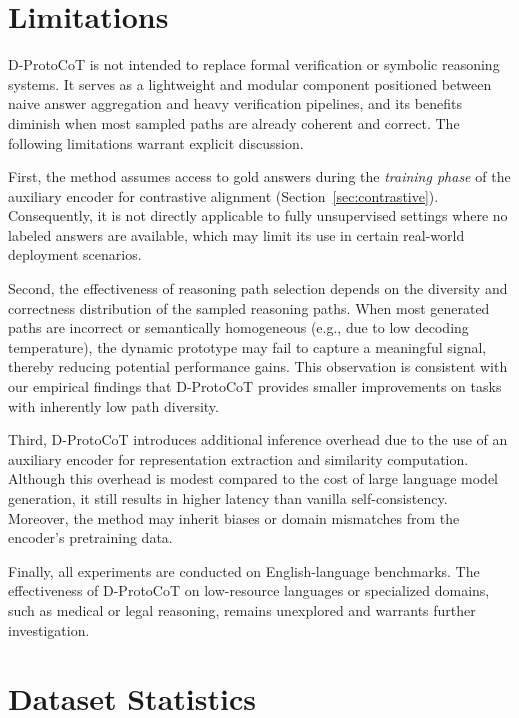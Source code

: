 \documentclass[a4paper,fleqn]{cas-dc}
\begin{document}
\section*{Limitations}

D-ProtoCoT is not intended to replace formal verification or symbolic reasoning systems. It serves as a lightweight and modular component positioned between naive answer aggregation and heavy verification pipelines, and its benefits diminish when most sampled paths are already coherent and correct.
The following limitations warrant explicit discussion.

First, the method assumes access to gold answers during the \textit{training phase} of the auxiliary encoder for contrastive alignment (Section~\ref{sec:contrastive}). Consequently, it is not directly applicable to fully unsupervised settings where no labeled answers are available, which may limit its use in certain real-world deployment scenarios.

Second, the effectiveness of reasoning path selection depends on the diversity and correctness distribution of the sampled reasoning paths. When most generated paths are incorrect or semantically homogeneous (e.g., due to low decoding temperature), the dynamic prototype may fail to capture a meaningful signal, thereby reducing potential performance gains. This observation is consistent with our empirical findings that D-ProtoCoT provides smaller improvements on tasks with inherently low path diversity.

Third, D-ProtoCoT introduces additional inference overhead due to the use of an auxiliary encoder for representation extraction and similarity computation. Although this overhead is modest compared to the cost of large language model generation, it still results in higher latency than vanilla self-consistency. Moreover, the method may inherit biases or domain mismatches from the encoder's pretraining data.

Finally, all experiments are conducted on English-language benchmarks. The effectiveness of D-ProtoCoT on low-resource languages or specialized domains, such as medical or legal reasoning, remains unexplored and warrants further investigation.

\appendix

\section{Dataset Statistics}
\label{sec:dataset-stats}
\end{document}
